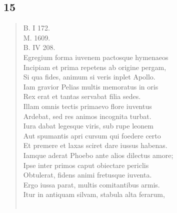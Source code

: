 \documentclass[11pt, a4paper]{report}
\begin{document}
            \subsection*{15}
      \begin{verse}
      B. I 172. \\ M. 1609. \\ B. IV 208. \\ Egregium forma iuvenem pactosque hymenaeos \\ Incipiam et prima repetens ab origine pergam, \\ Si qua fides, animum si veris inplet Apollo. \\ Iam gravior Pelias multis memoratus in oris \\ Rex erat et tantas servabat filia sedes. \\ Illam omnis tectis primaevo flore iuventus \\ Ardebat, sed res animos incognita turbat. \\ Iura dabat legesque viris, sub rupe leonem \\ Aut spumantis apri cursum qui foedere certo \\ Et premere et laxas sciret dare iussus habenas. \\ Iamque aderat Phoebo ante alios dilectus amore; \\ Ipse inter primos caput obiectare periclis \\ Obtulerat, fidens animi fretusque iuventa. \\ Ergo iussa parat, multis comitantibus armis. \\ Itur in antiquam silvam, stabula alta ferarum, \\ 
        ﻿\pagebreak 

\end{verse}
\end{document}
